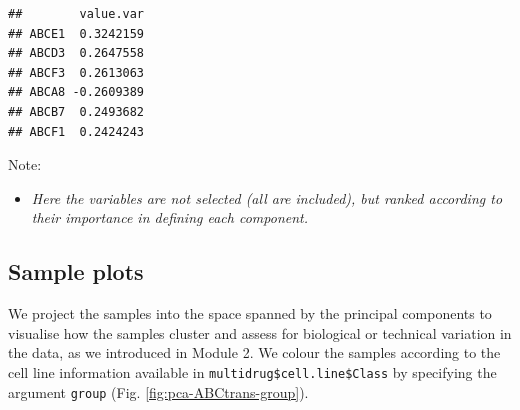 \documentclass[]{book}
\newenvironment{Shaded}{\begin{snugshade}}{\end{snugshade}}
\newcommand{\CommentTok}[1]{\textcolor[rgb]{0.56,0.35,0.01}{\textit{#1}}}
\newcommand{\DataTypeTok}[1]{\textcolor[rgb]{0.13,0.29,0.53}{#1}}
\newcommand{\DecValTok}[1]{\textcolor[rgb]{0.00,0.00,0.81}{#1}}
\newcommand{\KeywordTok}[1]{\textcolor[rgb]{0.13,0.29,0.53}{\textbf{#1}}}
\newcommand{\NormalTok}[1]{#1}
\newcommand{\OperatorTok}[1]{\textcolor[rgb]{0.81,0.36,0.00}{\textbf{#1}}}
\newcommand{\OtherTok}[1]{\textcolor[rgb]{0.56,0.35,0.01}{#1}}
\newcommand{\StringTok}[1]{\textcolor[rgb]{0.31,0.60,0.02}{#1}}
\providecommand{\tightlist}{%
  \setlength{\itemsep}{0pt}\setlength{\parskip}{0pt}}
\begin{document}
\begin{verbatim}
##        value.var
## ABCE1  0.3242159
## ABCD3  0.2647558
## ABCF3  0.2613063
## ABCA8 -0.2609389
## ABCB7  0.2493682
## ABCF1  0.2424243
\end{verbatim}

Note:

\begin{itemize}
\tightlist
\item
  \emph{Here the variables are not selected (all are included), but ranked according to their importance in defining each component.}
\end{itemize}

\hypertarget{meth-PCA-sample}{%
\subsection{Sample plots}\label{meth-PCA-sample}}

We project the samples into the space spanned by the principal components to visualise how the samples cluster and assess for biological or technical variation in the data, as we introduced in Module 2. We colour the samples according to the cell line information available in \texttt{multidrug\$cell.line\$Class} by specifying the argument \texttt{group} (Fig. \ref{fig:pca-ABCtrans-group}).

\begin{Shaded}
\end{Shaded}
\end{document}
